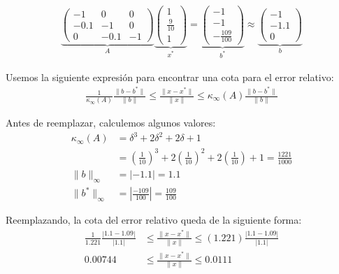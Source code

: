\begin{homeworkProblem}
\begin{enumerate}
\begin{solucion}
\begin{align*}
    \underbrace{
        \begin{pmatrix}
            -1 & 0 & 0\\
            -0.1 & -1 & 0\\
            0 & -0.1 & -1
        \end{pmatrix}
        }_{A}
        \underbrace{
        \begin{pmatrix}
            1  \\
            \frac{9}{10}  \\
            1 
        \end{pmatrix}
        }_{x^*}=
        \underbrace{
        \begin{pmatrix}
            -1 \\
            -1 \\
            -\frac{109}{100}
        \end{pmatrix}
        }_{b^*}\approx \underbrace{
        \begin{pmatrix}
            -1 \\
            -1.1 \\
            0
        \end{pmatrix}
        }_{b}
\end{align*}

Usemos la siguiente expresión para encontrar una cota para el error relativo:
\begin{align*}
    \frac{1}{\kappa_\infty(A)}\frac{\|b-b^*\|}{\|b\|} \leq \frac{\|x-x^*\|}{\|x\|} \leq \kappa_\infty(A)\frac{\|b-b^*\|}{\|b\|}
\end{align*}

Antes de reemplazar, calculemos algunos valores:
\begin{align*}
    \kappa_\infty(A) &= \delta^3 + 2\delta^2 + 2\delta + 1\\
    &= \left(\frac{1}{10}\right)^3 + 2\left(\frac{1}{10}\right)^2 + 2\left(\frac{1}{10}\right) + 1 = \frac{1221}{1000}\\
    \|b\|_\infty &= \left|-1.1\right| = 1.1\\
    \|b^*\|_\infty &= \left|\frac{-109}{100}\right| = \frac{109}{100}    
\end{align*}

Reemplazando, la cota del error relativo queda de la siguiente forma:
\begin{align*}
    \frac{1}{1.221} \frac{|1.1 - 1.09|}{|1.1|} &\leq \frac{\|x-x^*\|}{\|x\|} \leq (1.221) \frac{|1.1 - 1.09|}{|1.1|}\\
    0.00744 &\leq \frac{\|x-x^*\|}{\|x\|} \leq 0.0111
\end{align*}


\end{solucion}
\end{enumerate}
\end{homeworkProblem}
